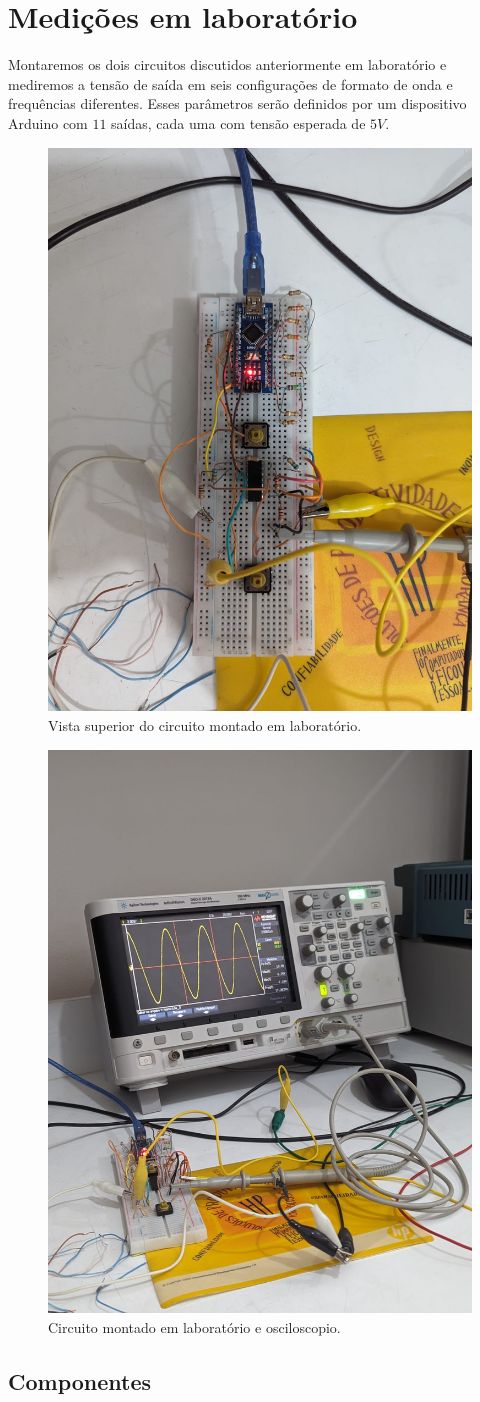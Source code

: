 \section{Medições em laboratório}

Montaremos os dois circuitos discutidos anteriormente em laboratório e mediremos a tensão de saída em seis configurações de formato de onda e frequências diferentes. Esses parâmetros serão definidos por um dispositivo Arduino com $11$ saídas, cada uma com tensão esperada de $5V$.

\begin{figure}[H]
    \centering
    \includegraphics[width=0.35\columnwidth]{images/circuito_montado.jpeg}
    \caption{Vista superior do circuito montado em laboratório.}
\end{figure}

\begin{figure}[H]
    \centering
    \includegraphics[width=0.35\columnwidth]{images/circuito_e_osciloscopio.jpeg}
    \caption{Circuito montado em laboratório e osciloscopio.}
\end{figure}

\newpage

\subsection{Componentes}

